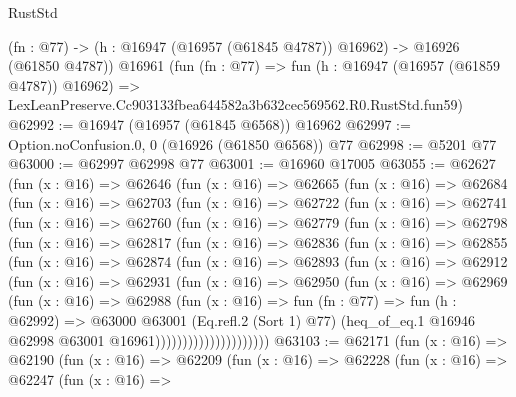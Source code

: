 \begin{lexlean}{RustStd}
\begin{coremodule}
    (fn : @77) -> (h : @16947 (@16957 (@61845 @4787)) @16962) -> @16926 (@61850 @4787))
    @16961
    (fun (fn : @77) =>
    fun (h : @16947 (@16957 (@61859 @4787)) @16962) =>
    LexLeanPreserve.Cc903133fbea644582a3b632cec569562.R0.RustStd.fun59)
@62992 := @16947 (@16957 (@61845 @6568)) @16962
@62997 := Option.noConfusion.{0, 0} (@16926 (@61850 @6568)) @77
@62998 := @5201 @77
@63000 := @62997 @62998 @77
@63001 := @16960 @17005
@63055 := @62627
    (fun (x : @16) =>
    @62646
      (fun (x : @16) =>
      @62665
        (fun (x : @16) =>
        @62684
          (fun (x : @16) =>
          @62703
            (fun (x : @16) =>
            @62722
              (fun (x : @16) =>
              @62741
                (fun (x : @16) =>
                @62760
                  (fun (x : @16) =>
                  @62779
                    (fun (x : @16) =>
                    @62798
                      (fun (x : @16) =>
                      @62817
                        (fun (x : @16) =>
                        @62836
                          (fun (x : @16) =>
                          @62855
                            (fun (x : @16) =>
                            @62874
                              (fun (x : @16) =>
                              @62893
                                (fun (x : @16) =>
                                @62912
                                  (fun (x : @16) =>
                                  @62931
                                    (fun (x : @16) =>
                                    @62950
                                      (fun (x : @16) =>
                                      @62969
                                        (fun (x : @16) =>
                                        @62988
                                          (fun (x : @16) =>
                                          fun (fn : @77) =>
                                          fun (h : @62992) =>
                                          @63000
                                            @63001
                                            (Eq.refl.{2} (Sort 1) @77)
                                            (heq_of_eq.{1}
                                              @16946
                                              @62998
                                              @63001
                                              @16961)))))))))))))))))))))
@63103 := @62171
    (fun (x : @16) =>
    @62190
      (fun (x : @16) =>
      @62209
        (fun (x : @16) =>
        @62228
          (fun (x : @16) =>
          @62247
            (fun (x : @16) =>

\end{coremodule}
\end{lexlean}

